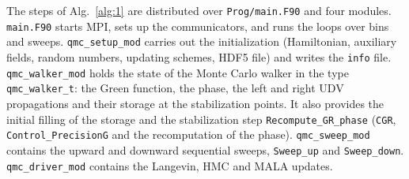 The steps of Alg.~\ref{alg:1} are distributed over \texttt{Prog/main.F90} and four modules.
\texttt{main.F90} starts MPI, sets up the communicators, and runs the loops over bins and sweeps.
\texttt{qmc\_setup\_mod} carries out the initialization (Hamiltonian, auxiliary fields, random numbers, updating schemes, HDF5 file) and writes the \texttt{info} file.
\texttt{qmc\_walker\_mod} holds the state of the Monte Carlo walker in the type \texttt{qmc\_walker\_t}: the Green function, the phase, the left and right UDV propagations and their storage at the stabilization points. It also provides the initial filling of the storage and the stabilization step \texttt{Recompute\_GR\_phase} (\texttt{CGR}, \texttt{Control\_PrecisionG} and the recomputation of the phase).
\texttt{qmc\_sweep\_mod} contains the upward and downward sequential sweeps, \texttt{Sweep\_up} and \texttt{Sweep\_down}.
\texttt{qmc\_driver\_mod} contains the Langevin, HMC and MALA updates.


